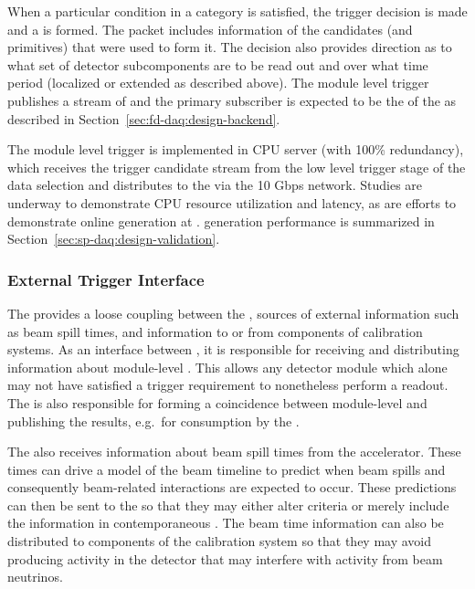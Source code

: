 When a particular condition in a category is satisfied, the trigger
decision is made and a  is formed. 
The  packet includes information of the candidates (and primitives)
that were used to form it. 
The decision also provides direction as to what set of detector subcomponents
are to be read out and over what time period (localized or extended as described above). 
The module level trigger publishes a stream of  and the primary subscriber is expected to be the  of the  as described in Section~\ref{sec:fd-daq:design-backend}.

The module level trigger is implemented in  CPU server (with 100\%
redundancy), which
receives the trigger candidate stream from the low level trigger stage
of the data selection and distributes  to the
 via the 10 Gbps  network. Studies are
underway to demonstrate CPU resource utilization and latency, as are
efforts to demonstrate online  generation at .
 generation performance is summarized in
Section~\ref{sec:sp-daq:design-validation}.

\subsubsection{External Trigger Interface}

The  provides a loose coupling between the
, sources of external information such as beam spill times,
and information to or from components of  
calibration systems. As an interface between , it is responsible for receiving and distributing information about module-level  .
This allows any detector module which alone may not have satisfied a  trigger requirement to nonetheless perform a  readout.
The  is also responsible for forming a coincidence between module-level   and publishing the results, e.g.~for consumption by the .

The  also receives information about beam spill times from the accelerator.
These times can drive a model of the beam timeline to predict when
beam spills and consequently beam-related interactions are expected to occur. 
These predictions can then be sent to the  so that they
may either alter  criteria or merely include the
information in contemporaneous . The beam time information can also be distributed to components of the calibration system so that they may avoid producing activity in the detector that may interfere with activity from beam neutrinos.

